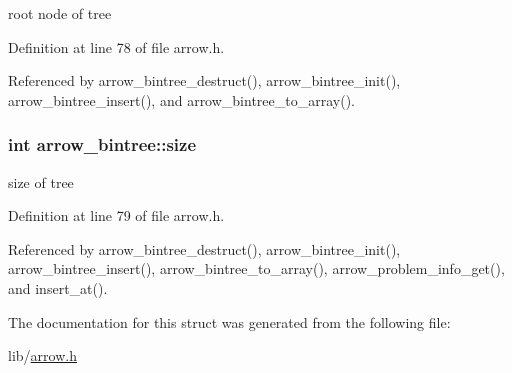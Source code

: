 root node of tree 

Definition at line 78 of file arrow.h.

Referenced by arrow\_\-bintree\_\-destruct(), arrow\_\-bintree\_\-init(), arrow\_\-bintree\_\-insert(), and arrow\_\-bintree\_\-to\_\-array().\hypertarget{structarrow__bintree_7570628df0b5317cc8e240499ba12974}{
\subsubsection{\setlength{\rightskip}{0pt plus 5cm}int {\bf arrow\_\-bintree::size}}}
\label{structarrow__bintree_7570628df0b5317cc8e240499ba12974}


size of tree 

Definition at line 79 of file arrow.h.

Referenced by arrow\_\-bintree\_\-destruct(), arrow\_\-bintree\_\-init(), arrow\_\-bintree\_\-insert(), arrow\_\-bintree\_\-to\_\-array(), arrow\_\-problem\_\-info\_\-get(), and insert\_\-at().

The documentation for this struct was generated from the following file:\begin{CompactItemize}
\item 
lib/\hyperlink{arrow_8h}{arrow.h}\end{CompactItemize}
